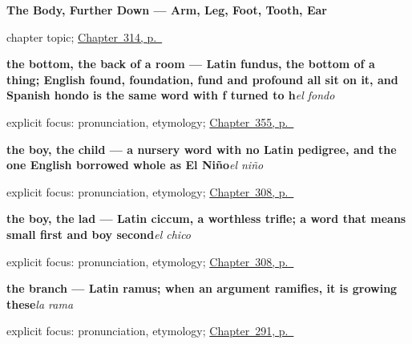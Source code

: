 \noindent\begin{minipage}[t]{\linewidth}
\raggedright
\textbf{The Body, Further Down --- Arm, Leg, Foot, Tooth, Ear}\par
\footnotesize chapter topic; \hyperref[ch:brazo-y-pie]{Chapter~314, p.~\pageref*{ch:brazo-y-pie}}
\end{minipage}\par\smallskip

\noindent\begin{minipage}[t]{\linewidth}
\raggedright
\textbf{the bottom, the back of a room — Latin fundus, the bottom of a thing; English found, foundation, fund and profound all sit on it, and Spanish hondo is the same word with f turned to h}\enspace\emph{el fondo}\par
\footnotesize explicit focus: pronunciation, etymology; \hyperref[ch:la-pared-y-el-techo]{Chapter~355, p.~\pageref*{ch:la-pared-y-el-techo}}
\end{minipage}\par\smallskip

\noindent\begin{minipage}[t]{\linewidth}
\raggedright
\textbf{the boy, the child --- a nursery word with no Latin pedigree, and the one English borrowed whole as El Niño}\enspace\emph{el niño}\par
\footnotesize explicit focus: pronunciation, etymology; \hyperref[ch:ninos-y-gente]{Chapter~308, p.~\pageref*{ch:ninos-y-gente}}
\end{minipage}\par\smallskip

\noindent\begin{minipage}[t]{\linewidth}
\raggedright
\textbf{the boy, the lad --- Latin ciccum, a worthless trifle; a word that means small first and boy second}\enspace\emph{el chico}\par
\footnotesize explicit focus: pronunciation, etymology; \hyperref[ch:ninos-y-gente]{Chapter~308, p.~\pageref*{ch:ninos-y-gente}}
\end{minipage}\par\smallskip

\noindent\begin{minipage}[t]{\linewidth}
\raggedright
\textbf{the branch — Latin ramus; when an argument ramifies, it is growing these}\enspace\emph{la rama}\par
\footnotesize explicit focus: pronunciation, etymology; \hyperref[ch:de-la-semilla]{Chapter~291, p.~\pageref*{ch:de-la-semilla}}
\end{minipage}\par\smallskip

